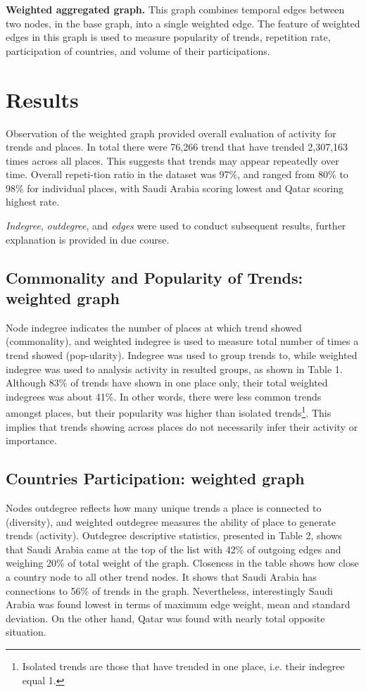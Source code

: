 \documentclass{llncs}
\begin{document}
{\textbf{Weighted aggregated graph.}} This graph combines temporal
edges between two nodes, in the base graph, into a single weighted
edge. The feature of weighted edges in this graph is used to measure
popularity of trends, repetition rate, participation of countries, and
volume of their participations.


\section{Results}\label{results}

Observation of the weighted graph provided overall evaluation of
activity for trends and places. In total there were 76,266 trend that
have trended 2,307,163 times across all places. This suggests that
trends may appear repeatedly over time. Overall repeti-tion ratio in
the dataset was 97\%, and ranged from 80\% to 98\% for individual
places, with Saudi Arabia scoring lowest and Qatar scoring highest
rate.

{\emph{Indegree}}, {\emph{outdegree}}, and {\emph{edges}} were used to
conduct subsequent results, further explanation is provided in due
course.


\subsection{Commonality and Popularity of Trends: weighted graph}

Node indegree indicates the number of places at which trend showed
(commonality), and weighted indegree is used to measure total number
of times a trend showed (pop-ularity). Indegree was used to group
trends to, while weighted indegree was used to analysis activity in
resulted groups, as shown in Table 1. Although 83\% of trends have
shown in one place only, their total weighted indegrees was about
41\%. In other words, there were less common trends amongst places,
but their popularity was higher than isolated trends\footnote{Isolated
trends are those that have trended in one place, i.e. their indegree
equal 1.}. This implies that trends showing across places do not
necessarily infer their activity or importance.


\subsection{Countries Participation: weighted graph}

Nodes outdegree reflects how many unique trends a place is connected
to (diversity), and weighted outdegree measures the ability of place
to generate trends (activity). Outdegree descriptive statistics,
presented in Table 2, shows that Saudi Arabia came at the top of the
list with 42\% of outgoing edges and weighing 20\% of total weight of
the graph. Closeness in the table shows how close a country node to
all other trend nodes. It shows that Saudi Arabia has connections to
56\% of trends in the graph. Nevertheless, interestingly Saudi Arabia
was found lowest in terms of maximum edge weight, mean and standard
deviation. On the other hand, Qatar was found with nearly total
opposite situation.
\end{document}
